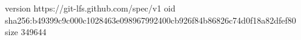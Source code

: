 version https://git-lfs.github.com/spec/v1
oid sha256:b49399c9c000c1028463e098967992400cb926f84b86826c74d0f18a82dfef80
size 349644
